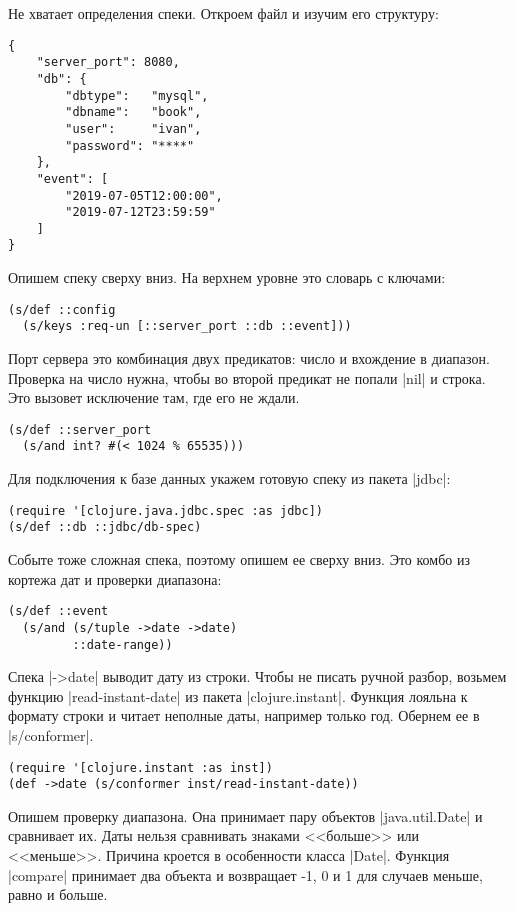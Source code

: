Не хватает определения спеки. Откроем файл и изучим его структуру:

\begin{verbatim}
{
    "server_port": 8080,
    "db": {
        "dbtype":   "mysql",
        "dbname":   "book",
        "user":     "ivan",
        "password": "****"
    },
    "event": [
        "2019-07-05T12:00:00",
        "2019-07-12T23:59:59"
    ]
}
\end{verbatim}

\noindent
Опишем спеку сверху вниз. На верхнем уровне это словарь с ключами:

\begin{verbatim}
(s/def ::config
  (s/keys :req-un [::server_port ::db ::event]))
\end{verbatim}

Порт сервера это комбинация двух предикатов: число и вхождение в диапазон.
Проверка на число нужна, чтобы во второй предикат не попали \spverb|nil| и
строка. Это вызовет исключение там, где его не ждали.

\begin{verbatim}
(s/def ::server_port
  (s/and int? #(< 1024 % 65535)))
\end{verbatim}

Для подключения к базе данных укажем готовую спеку из пакета \spverb|jdbc|:

\begin{verbatim}
(require '[clojure.java.jdbc.spec :as jdbc])
(s/def ::db ::jdbc/db-spec)
\end{verbatim}

Событе тоже сложная спека, поэтому опишем ее сверху вниз. Это комбо из кортежа
дат и проверки диапазона:

\begin{verbatim}
(s/def ::event
  (s/and (s/tuple ->date ->date)
         ::date-range))
\end{verbatim}

Спека \spverb|->date| выводит дату из строки. Чтобы не писать ручной разбор,
возьмем функцию \spverb|read-instant-date| из пакета
\spverb|clojure.instant|. Функция лояльна к формату строки и читает неполные
даты, например только год. Обернем ее в \spverb|s/conformer|.

\begin{verbatim}
(require '[clojure.instant :as inst])
(def ->date (s/conformer inst/read-instant-date))
\end{verbatim}

Опишем проверку диапазона. Она принимает пару объектов \spverb|java.util.Date| и
сравнивает их. Даты нельзя сравнивать знаками <<больше>> или <<меньше>>. Причина
кроется в особенности класса \spverb|Date|. Функция \spverb|compare| принимает
два объекта и возвращает -1, 0 и 1 для случаев меньше, равно и больше.

